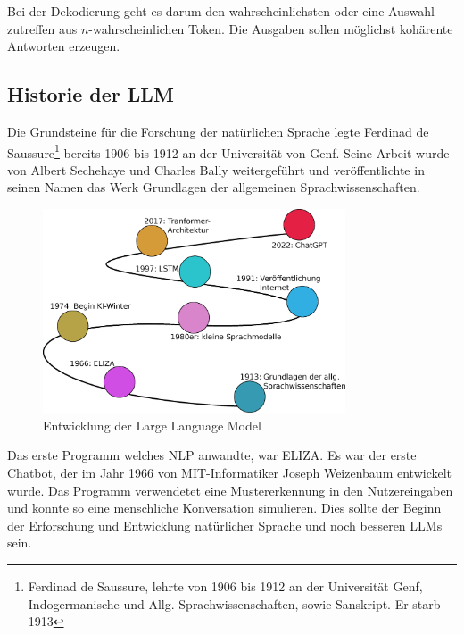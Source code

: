 Bei der Dekodierung geht es darum den wahrscheinlichsten oder eine Auswahl zutreffen aus $n$-wahrscheinlichen Token. Die Ausgaben sollen möglichst kohärente Antworten erzeugen.


\subsection{Historie der LLM}
Die Grundsteine für die Forschung der natürlichen Sprache legte Ferdinad de Saussure\footnote{Ferdinad de Saussure, lehrte von 1906 bis 1912 an der Universität Genf, Indogermanische und Allg. Sprachwissenschaften, sowie Sanskript. Er starb 1913} bereits 1906 bis 1912 an der Universität von Genf. Seine Arbeit wurde von Albert Sechehaye und Charles Bally weitergeführt und veröffentlichte in seinen Namen das Werk \glqq Grundlagen der allgemeinen Sprachwissenschaften\grqq .

\begin{center}
	\begin{figure}[!ht]
		\includegraphics[width=0.8\textwidth]{content/chapter_basics/images/evolution_of_llm.eps}
		\centering
		\caption{Entwicklung der Large Language Model}
		\label{img:evolotion_of_llm}
	\end{figure}
\end{center}

Das erste Programm welches \acrshort{NLP} anwandte, war ELIZA. Es war der erste Chatbot, der im Jahr 1966 von MIT-Informatiker Joseph Weizenbaum entwickelt wurde. Das Programm verwendetet eine Mustererkennung in den Nutzereingaben und konnte so eine menschliche Konversation simulieren. Dies sollte der Beginn der Erforschung und Entwicklung natürlicher Sprache und noch besseren LLMs sein.\vspace{0.2cm}

